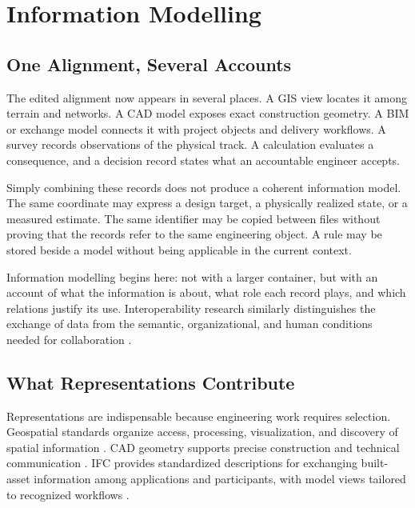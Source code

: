 
\chapter{Information Modelling}
\label{chap:information-modelling}

\section{One Alignment, Several Accounts}

The edited alignment now appears in several places. A GIS view locates it among
terrain and networks. A CAD model exposes exact construction geometry. A BIM or
exchange model connects it with project objects and delivery workflows. A
survey records observations of the physical track. A calculation evaluates a
consequence, and a decision record states what an accountable engineer accepts.

Simply combining these records does not produce a coherent information model.
The same coordinate may express a design target, a physically realized state,
or a measured estimate. The same identifier may be copied between files without
proving that the records refer to the same engineering object. A rule may be
stored beside a model without being applicable in the current context.

Information modelling begins here: not with a larger container, but with an
account of what the information is about, what role each record plays, and which
relations justify its use. Interoperability research similarly distinguishes
the exchange of data from the semantic, organizational, and human conditions
needed for collaboration \cite{Turk2020Interoperability}.

\section{What Representations Contribute}

Representations are indispensable because engineering work requires selection.
Geospatial standards organize access, processing, visualization, and discovery
of spatial information \cite{OGCStandardsProgram2025}. CAD geometry supports
precise construction and technical communication
\cite{KimKumarSnider2015Geometry}. IFC provides standardized descriptions for
exchanging built-asset information among applications and participants, with
model views tailored to recognized workflows
\cite{BuildingSMARTIFC4x3Scope}.

